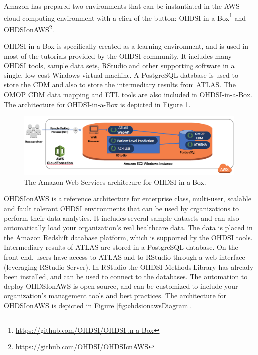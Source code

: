 \documentclass[11pt]{book}
\let\rmarkdownfootnote\footnote%
\def\footnote{\protect\rmarkdownfootnote}
\theoremstyle{definition}
\theoremstyle{definition}
\theoremstyle{definition}
\theoremstyle{remark}
\begin{document}
Amazon has prepared two environments that can be instantiated in the AWS cloud computing environment with a click of the button: OHDSI-in-a-Box\footnote{\url{https://github.com/OHDSI/OHDSI-in-a-Box}} and OHDSIonAWS\footnote{\url{https://github.com/OHDSI/OHDSIonAWS}}.

OHDSI-in-a-Box is specifically created as a learning environment, and is used in most of the tutorials provided by the OHDSI community. It includes many OHDSI tools, sample data sets, RStudio and other supporting software in a single, low cost Windows virtual machine. A PostgreSQL database is used to store the CDM and also to store the intermediary results from ATLAS. The OMOP CDM data mapping and ETL tools are also included in OHDSI-in-a-Box. The architecture for OHDSI-in-a-Box is depicted in Figure \ref{fig:ohdsiinaboxDiagram}.

\begin{figure}

{\centering \includegraphics[width=1\linewidth]{images/OhdsiAnalyticsTools/OHDSI-in-a-BoxDiagram} 

}

\caption{The Amazon Web Services architecure for OHDSI-in-a-Box.}\label{fig:ohdsiinaboxDiagram}
\end{figure}

OHDSIonAWS is a reference architecture for enterprise class, multi-user, scalable and fault tolerant OHDSI environments that can be used by organizations to perform their data analytics. It includes several sample datasets and can also automatically load your organization's real healthcare data. The data is placed in the Amazon Redshift database platform, which is supported by the OHDSI tools. Intermediary results of ATLAS are stored in a PostgreSQL database. On the front end, users have access to ATLAS and to RStudio through a web interface (leveraging RStudio Server). In RStudio the OHDSI Methods Library has already been installed, and can be used to connect to the databases. The automation to deploy OHDSIonAWS is open-source, and can be customized to include your organization's management tools and best practices. The architecture for OHDSIonAWS is depicted in Figure \ref{fig:ohdsionawsDiagram}.
\end{document}
